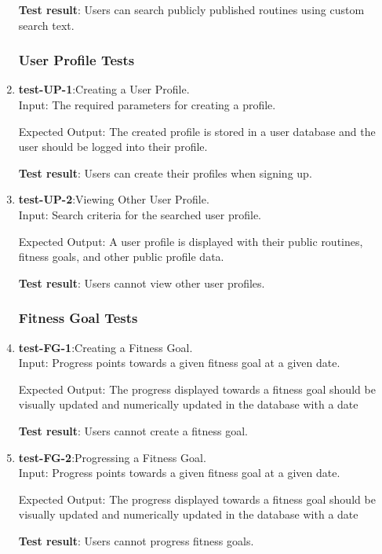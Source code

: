 \documentclass[12pt, titlepage]{article}
\begin{document}
\begin{enumerate}
    \textbf{Test result}: Users can search publicly published routines using custom search text.
   
\subsubsection{User Profile Tests}
    \item{\textbf{test-UP-1}}:Creating a User Profile.\\
    Input: The required parameters for creating a profile.
	
    Expected Output: The created profile is stored in a user database and the user should be logged into their profile.
    
    \textbf{Test result}: Users can create their profiles when signing up.
   
    \item{\textbf{test-UP-2}}:Viewing Other User Profile.\\
    Input: Search criteria for the searched user profile.
	
    Expected Output: A user profile is displayed with their public routines, fitness goals, and other public profile data.
    
    \textbf{Test result}: Users cannot view other user profiles.
   
\subsubsection{Fitness Goal Tests}
    \item{\textbf{test-FG-1}}:Creating a Fitness Goal.\\
    Input: Progress points towards a given fitness goal at a given date.
	
    Expected Output: The progress displayed towards a fitness goal should be visually updated and numerically updated in the database with a date
    
    \textbf{Test result}: Users cannot create a fitness goal.
   
    \item{\textbf{test-FG-2}}:Progressing a Fitness Goal.\\
    Input: Progress points towards a given fitness goal at a given date.
	
    Expected Output: The progress displayed towards a fitness goal should be visually updated and numerically updated in the database with a date
    
    \textbf{Test result}: Users cannot progress fitness goals.
 
\end{enumerate}
\end{document}
